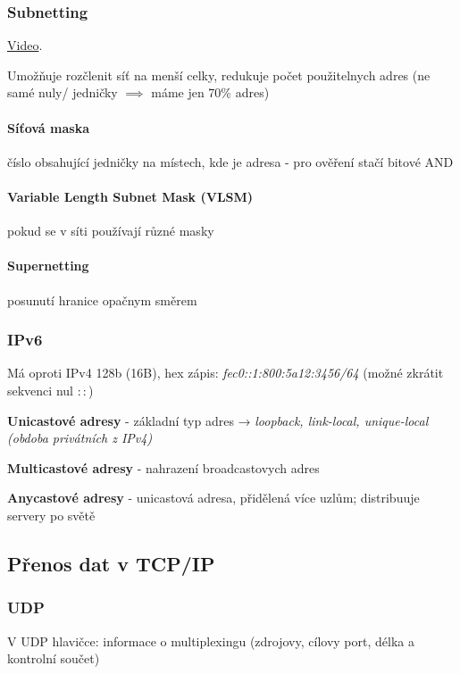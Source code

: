\documentclass[10pt,a4paper]{article}
\begin{document}
\subsubsection{Subnetting}

\href{https://youtu.be/6_giEv20En0}{Video}.

Umožňuje rozčlenit síť na menší celky, redukuje počet použitelnych adres (ne samé nuly/ jedničky $\implies$ máme jen 70\% adres)


\paragraph{Síťová maska} číslo obsahující jedničky na místech, kde je adresa - pro ověření stačí bitové AND

\paragraph{Variable Length Subnet Mask (VLSM)} pokud se v síti používají různé masky

\paragraph{Supernetting} posunutí hranice opačnym směrem


\subsubsection{IPv6}

Má oproti IPv4 128b (16B), hex zápis: \textit{fec0::1:800:5a12:3456/64} (možné zkrátit sekvenci nul $::$)

\textbf{Unicastové adresy} - základní typ adres → \textit{loopback, link-local, unique-local (obdoba privátních z IPv4)}

\textbf{Multicastové adresy} - nahrazení broadcastovych adres

\textbf{Anycastové adresy} - unicastová adresa, přidělená více uzlům; distribuuje servery po světě

\subsection{Přenos dat v TCP/IP}

\subsubsection{UDP}

V UDP hlavičce: informace o multiplexingu (zdrojovy, cílovy port, délka a kontrolní součet)
\end{document}
